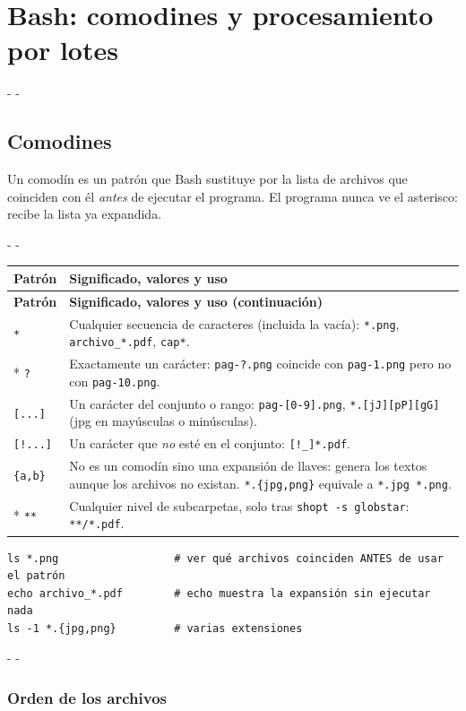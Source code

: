 \documentclass[11pt,a4paper]{article}
\makeatletter
\newcommand{\necesitaespacio}[1]{\par\penalty-100\begingroup
	\setlength{\dimen@}{#1}\dimen@ii\pagegoal\advance\dimen@ii-\pagetotal
	\ifdim\dimen@>\dimen@ii\ifdim\dimen@ii>\z@\vfil\fi\penalty-\@M\fi\endgroup}
\newenvironment{opciones}[1][Opción]{%
	\par\begingroup\small
	\begin{longtable}{L{4.25cm}L{11.2cm}}
		\toprule\rowcolor{tablacab}\cab{#1} & \cab{Significado, valores y uso} \\ \midrule
		\endfirsthead
		\toprule\rowcolor{tablacab}\cab{#1} & \cab{Significado, valores y uso (continuación)} \\ \midrule
		\endhead
		\bottomrule
		\endfoot}
	{\end{longtable}\endgroup}
\newcommand{\cmd}[1]{\texttt{\textcolor{colcmd}{#1}}}      %
\newcommand{\arch}[1]{\texttt{\textcolor{colarch}{#1}}}    %
\newcommand{\cab}[1]{\textbf{#1}}
\makeatother
\begin{document}
	\clearpage
	\section{Bash: comodines y procesamiento por lotes}\label{sec:bash}
	
	\necesitaespacio{24\baselineskip}
	\subsection{Comodines}\label{sec:comodines}
	
	Un comodín es un patrón que Bash sustituye por la lista de archivos que coinciden con él \emph{antes} de ejecutar el programa. El programa nunca ve el asterisco: recibe la lista ya expandida.
	
	\necesitaespacio{20\baselineskip}
	\begin{opciones}[Patrón]
		\texttt{*} & Cualquier secuencia de caracteres (incluida la vacía): \arch{*.png}, \arch{archivo\_*.pdf}, \arch{cap*}.\\*
		\texttt{?} & Exactamente un carácter: \arch{pag-?.png} coincide con \arch{pag-1.png} pero no con \arch{pag-10.png}.\\
		\texttt{[...]} & Un carácter del conjunto o rango: \arch{pag-[0-9].png}, \arch{*.[jJ][pP][gG]} (jpg en mayúsculas o minúsculas).\\
		\texttt{[!...]} & Un carácter que \emph{no} esté en el conjunto: \arch{[!\_]*.pdf}.\\
		\texttt{\{a,b\}} & No es un comodín sino una expansión de llaves: genera los textos aunque los archivos no existan. \arch{*.\{jpg,png\}} equivale a \arch{*.jpg *.png}.\\*
		\texttt{**} & Cualquier nivel de subcarpetas, solo tras \cmd{shopt -s globstar}: \arch{**/*.pdf}.\\
	\end{opciones}
	
	\begin{lstlisting}
ls *.png                  # ver qué archivos coinciden ANTES de usar el patrón
echo archivo_*.pdf        # echo muestra la expansión sin ejecutar nada
ls -1 *.{jpg,png}         # varias extensiones
\end{lstlisting}
	
	\necesitaespacio{6\baselineskip}
	\subsubsection{Orden de los archivos}\label{sec:orden}
	
\end{document}
